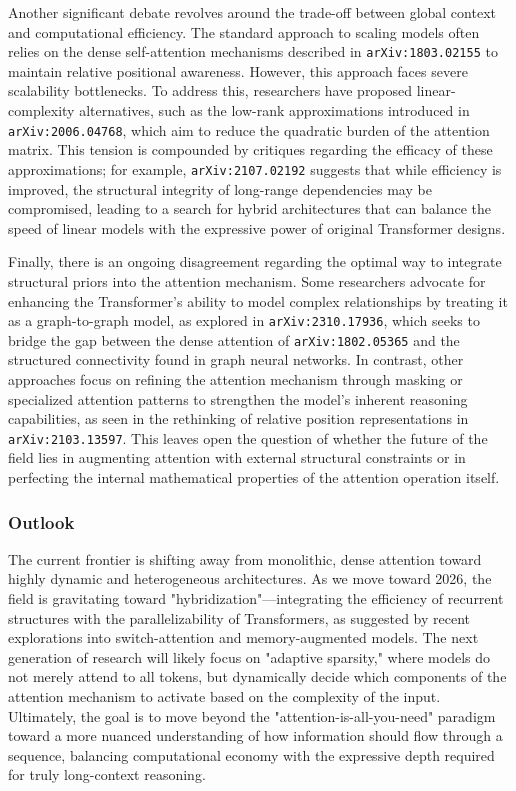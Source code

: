 \documentclass[11pt]{article}
\begin{document}
Another significant debate revolves around the trade-off between global context and computational efficiency. The standard approach to scaling models often relies on the dense self-attention mechanisms described in \texttt{arXiv:1803.02155} to maintain relative positional awareness. However, this approach faces severe scalability bottlenecks. To address this, researchers have proposed linear-complexity alternatives, such as the low-rank approximations introduced in \texttt{arXiv:2006.04768}, which aim to reduce the quadratic burden of the attention matrix. This tension is compounded by critiques regarding the efficacy of these approximations; for example, \texttt{arXiv:2107.02192} suggests that while efficiency is improved, the structural integrity of long-range dependencies may be compromised, leading to a search for hybrid architectures that can balance the speed of linear models with the expressive power of original Transformer designs.

Finally, there is an ongoing disagreement regarding the optimal way to integrate structural priors into the attention mechanism. Some researchers advocate for enhancing the Transformer's ability to model complex relationships by treating it as a graph-to-graph model, as explored in \texttt{arXiv:2310.17936}, which seeks to bridge the gap between the dense attention of \texttt{arXiv:1802.05365} and the structured connectivity found in graph neural networks. In contrast, other approaches focus on refining the attention mechanism through masking or specialized attention patterns to strengthen the model's inherent reasoning capabilities, as seen in the rethinking of relative position representations in \texttt{arXiv:2103.13597}. This leaves open the question of whether the future of the field lies in augmenting attention with external structural constraints or in perfecting the internal mathematical properties of the attention operation itself.

\subsubsection{Outlook}

The current frontier is shifting away from monolithic, dense attention toward highly dynamic and heterogeneous architectures. As we move toward 2026, the field is gravitating toward "hybridization"—integrating the efficiency of recurrent structures with the parallelizability of Transformers, as suggested by recent explorations into switch-attention and memory-augmented models. The next generation of research will likely focus on "adaptive sparsity," where models do not merely attend to all tokens, but dynamically decide which components of the attention mechanism to activate based on the complexity of the input. Ultimately, the goal is to move beyond the "attention-is-all-you-need" paradigm toward a more nuanced understanding of how information should flow through a sequence, balancing computational economy with the expressive depth required for truly long-context reasoning.
\end{document}
